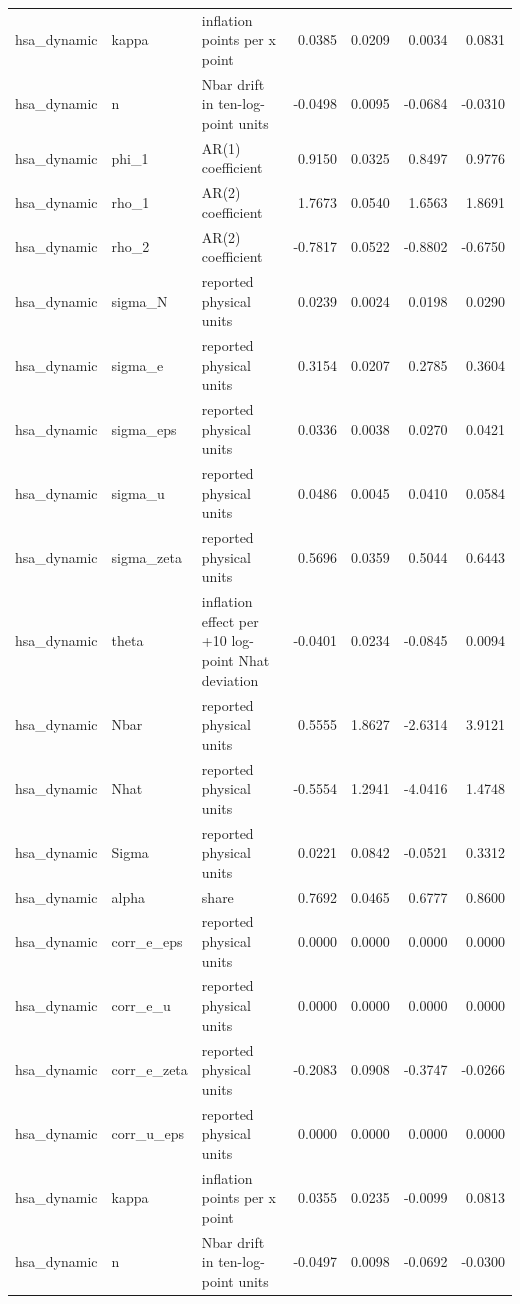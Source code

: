 \begin{tabular}{lllrrrr}
hsa\_dynamic & kappa & inflation points per x point & 0.0385 & 0.0209 & 0.0034 & 0.0831 \\
hsa\_dynamic & n & Nbar drift in ten-log-point units & -0.0498 & 0.0095 & -0.0684 & -0.0310 \\
hsa\_dynamic & phi\_1 & AR(1) coefficient & 0.9150 & 0.0325 & 0.8497 & 0.9776 \\
hsa\_dynamic & rho\_1 & AR(2) coefficient & 1.7673 & 0.0540 & 1.6563 & 1.8691 \\
hsa\_dynamic & rho\_2 & AR(2) coefficient & -0.7817 & 0.0522 & -0.8802 & -0.6750 \\
hsa\_dynamic & sigma\_N & reported physical units & 0.0239 & 0.0024 & 0.0198 & 0.0290 \\
hsa\_dynamic & sigma\_e & reported physical units & 0.3154 & 0.0207 & 0.2785 & 0.3604 \\
hsa\_dynamic & sigma\_eps & reported physical units & 0.0336 & 0.0038 & 0.0270 & 0.0421 \\
hsa\_dynamic & sigma\_u & reported physical units & 0.0486 & 0.0045 & 0.0410 & 0.0584 \\
hsa\_dynamic & sigma\_zeta & reported physical units & 0.5696 & 0.0359 & 0.5044 & 0.6443 \\
hsa\_dynamic & theta & inflation effect per +10 log-point Nhat deviation & -0.0401 & 0.0234 & -0.0845 & 0.0094 \\
hsa\_dynamic & Nbar & reported physical units & 0.5555 & 1.8627 & -2.6314 & 3.9121 \\
hsa\_dynamic & Nhat & reported physical units & -0.5554 & 1.2941 & -4.0416 & 1.4748 \\
hsa\_dynamic & Sigma & reported physical units & 0.0221 & 0.0842 & -0.0521 & 0.3312 \\
hsa\_dynamic & alpha & share & 0.7692 & 0.0465 & 0.6777 & 0.8600 \\
hsa\_dynamic & corr\_e\_eps & reported physical units & 0.0000 & 0.0000 & 0.0000 & 0.0000 \\
hsa\_dynamic & corr\_e\_u & reported physical units & 0.0000 & 0.0000 & 0.0000 & 0.0000 \\
hsa\_dynamic & corr\_e\_zeta & reported physical units & -0.2083 & 0.0908 & -0.3747 & -0.0266 \\
hsa\_dynamic & corr\_u\_eps & reported physical units & 0.0000 & 0.0000 & 0.0000 & 0.0000 \\
hsa\_dynamic & kappa & inflation points per x point & 0.0355 & 0.0235 & -0.0099 & 0.0813 \\
hsa\_dynamic & n & Nbar drift in ten-log-point units & -0.0497 & 0.0098 & -0.0692 & -0.0300 \\

\end{tabular}
